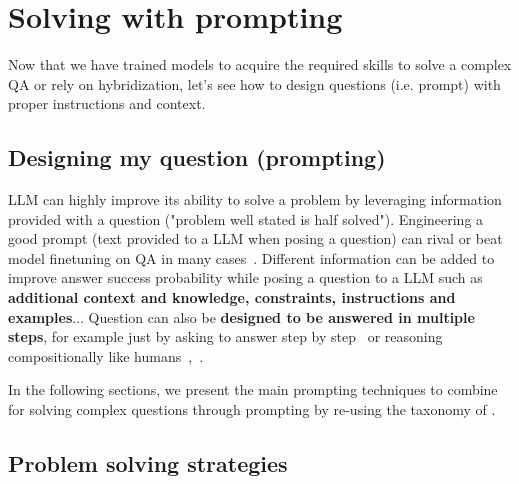 \documentclass[acmsmall]{acmart}
\begin{document}
\small

\titleformat{\subsection}{\normalfont\small\bfseries}{\thesubsection}{1em}{}
\titlespacing{\subsection}{1em}{\parskip}{\parskip}

\section{Solving with prompting}\label{sec_solvingCQA}\label{sec_prompting}
Now that we have trained models to acquire the required skills to solve a complex QA or rely on hybridization, let's see how to design questions (i.e. prompt) with proper instructions and context.

\subsection{Designing my question (prompting)}
LLM can highly improve its ability to solve a problem by leveraging information provided with a question ("problem well stated is half solved"). Engineering a good prompt (text provided to a LLM when posing a question) can rival or beat model finetuning on QA in many cases~\citep{chowdheryPaLMScalingLanguage2022}. Different information can be added to improve answer success probability while posing a question to a LLM such as \textbf{additional context and knowledge, constraints, instructions and examples}... Question can also be \textbf{designed to be answered in multiple steps}, for example just by asking to answer step by step~\citep{weiChainThoughtPrompting2022, kojimaLargeLanguageModels2023} or reasoning compositionally like humans~\citep{drozdovCompositionalSemanticParsing2022},~\citep{zhouLeasttoMostPromptingEnables2022, duaSuccessivePromptingDecomposing2022}.

In the following sections, we present the main prompting techniques to combine for solving complex questions through prompting by re-using the taxonomy of \citet{qiaoReasoningLanguageModel2022}.

\subsection{Problem solving strategies}
\end{document}
